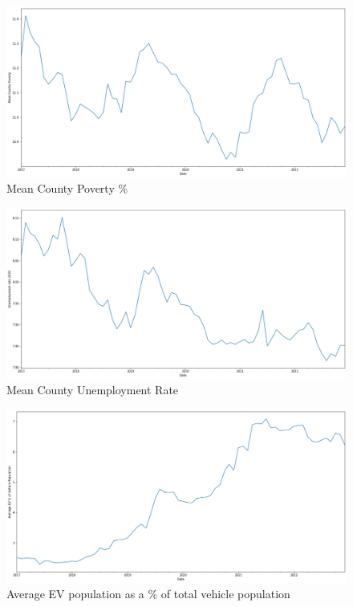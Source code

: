 \documentclass{article}
\begin{document}
\begin{figure}[!htb]
  \includegraphics[width=\linewidth]{mean county pov}
  \caption{Mean County Poverty \%}
\end{figure}

\begin{figure}[!htb]
  \includegraphics[width=\linewidth]{mean county unemp}
  \caption{Mean County Unemployment Rate}
\end{figure}

\begin{figure}[!htb]
  \includegraphics[width=\linewidth]{evpop}
  \caption{Average EV population as a \% of total vehicle population}
\end{figure}
\end{document}
